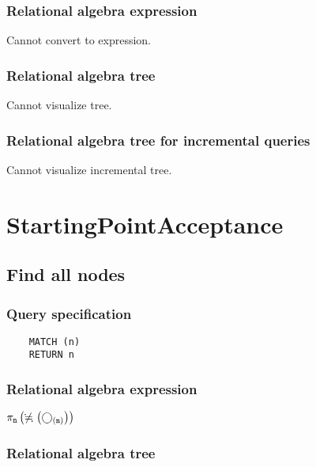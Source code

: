 	\subsubsection*{Relational algebra expression}

	Cannot convert to expression.

	\subsubsection*{Relational algebra tree}

	Cannot visualize tree.

	\subsubsection*{Relational algebra tree for incremental queries}

	Cannot visualize incremental tree.

	\section{StartingPointAcceptance}

	\subsection{Find all nodes}

	\subsubsection*{Query specification}

	\begin{lstlisting}
	MATCH (n)
	RETURN n
	\end{lstlisting}


	\subsubsection*{Relational algebra expression}

	$\projection{\var{n}} \left(\alldifferent{} \left(\getvertices{n}{}\right)\right)$

	\subsubsection*{Relational algebra tree}


